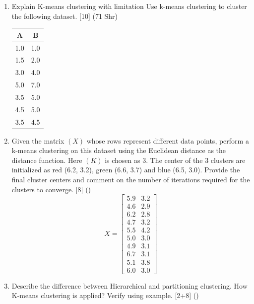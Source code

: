 \documentclass[12pt]{article}
\begin{document}
\begin{enumerate}[topsep=0pt, noitemsep]
      \item Explain K-means clustering with limitation Use k-means clustering to cluster the following dataset. \hfill [10] (71 Shr)\\
        \small
        \begin{tabular}{|c|c|}
          \hline
          A & B \\ \hline
          1.0 & 1.0 \\ \hline
          1.5 & 2.0 \\ \hline
          3.0 & 4.0 \\ \hline
          5.0 & 7.0 \\ \hline
          3.5 & 5.0 \\ \hline
          4.5 & 5.0 \\ \hline
          3.5 & 4.5 \\ \hline
        \end{tabular}
        \normalsize

      \item Given the matrix $(X)$ whose rows represent different data points, perform a k-means clustering on this dataset using the Euclidean distance as the distance function. Here $(K)$ is chosen as 3. The center of the 3 clusters are initialized as red (6.2, 3.2), green (6.6, 3.7) and blue (6.5, 3.0). Provide the final cluster centers and comment on the number of iterations required for the clusters to converge. \hfill [8] ()
        \[ X = \begin{bmatrix}
          5.9 & 3.2 \\ 4.6 & 2.9 \\ 6.2 & 2.8 \\ 4.7 & 3.2 \\ 5.5 & 4.2 \\
          5.0 & 3.0 \\ 4.9 & 3.1 \\ 6.7 & 3.1 \\ 5.1 & 3.8 \\ 6.0 & 3.0
        \end{bmatrix} \]

      \item Describe the difference between Hierarchical and partitioning clustering. How K-means clustering is applied? Verify using example. \hfill [2+8] ()
    \end{enumerate}
\end{document}
